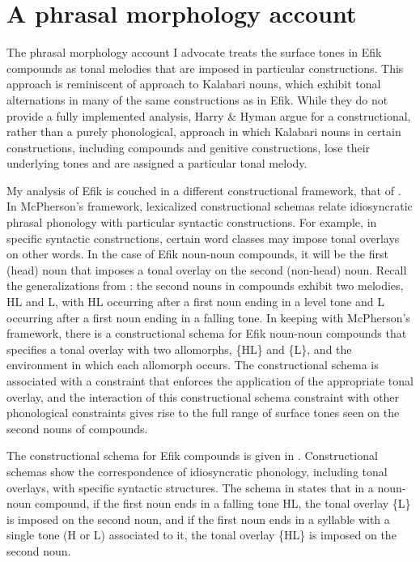 \documentclass[output=paper]{langscibook}
\begin{document}
\section{A phrasal morphology account}\label{sec:glewwe:2}

The phrasal morphology account I advocate treats the surface tones in Efik compounds as tonal melodies that are imposed in particular constructions. This approach is reminiscent of \cite{harry2014phrasal} approach to Kalabari nouns, which exhibit tonal alternations in many of the same constructions as in Efik. While they do not provide a fully implemented analysis, Harry \& Hyman argue for a constructional, rather than a purely phonological, approach in which Kalabari nouns in certain constructions, including compounds and genitive constructions, lose their underlying tones and are assigned a particular tonal melody. 

My analysis of Efik is couched in a different constructional framework, that of \citealt{McPherson2014}. In McPherson’s framework, lexicalized constructional schemas relate idiosyncratic phrasal phonology with particular syntactic constructions. For example, in specific syntactic constructions, certain word classes may impose tonal overlays on other words. In the case of Efik noun-noun compounds, it will be the first (head) noun that imposes a tonal overlay on the second (non-head) noun. Recall the generalizations from : the second nouns in compounds exhibit two melodies, HL and L, with HL occurring after a first noun ending in a level tone and L occurring after a first noun ending in a falling tone. In keeping with McPherson’s framework, there is a constructional schema for Efik noun-noun compounds that specifies a tonal overlay with two allomorphs, \{HL\} and \{L\}, and the environment in which each allomorph occurs. The constructional schema is associated with a constraint that enforces the application of the appropriate tonal overlay, and the interaction of this constructional schema constraint with other phonological constraints gives rise to the full range of surface tones seen on the second nouns of compounds. 

The constructional schema for Efik compounds is given in . Constructional schemas show the correspondence of idiosyncratic phonology, including tonal overlays, with specific syntactic structures. The schema in  states that in a noun-noun compound, if the first noun ends in a falling tone HL, the tonal overlay \{L\} is imposed on the second noun, and if the first noun ends in a syllable with a single tone (H or L) associated to it, the tonal overlay \{HL\} is imposed on the second noun. 
\end{document}
